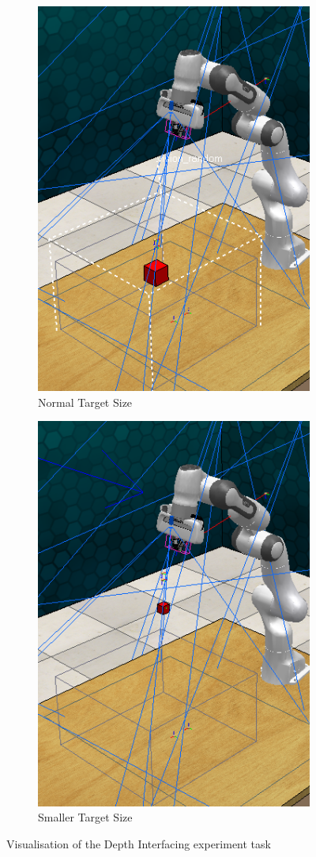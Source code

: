 \begin{figure}[htpb] %
  \centering
  \begin{subfigure}{0.4\linewidth}
    \centering
    \includegraphics[width=0.7\linewidth]{assets/depth-interfacing/normal-size-grasp.png}
    \caption{Normal Target Size}\label{subfig:normal-grasp}
  \end{subfigure}
  \begin{subfigure}{0.4\linewidth}
    \centering
    \includegraphics[width=0.7\linewidth]{assets/depth-interfacing/smaller-grasp.png}
    \caption{Smaller Target Size}\label{subfig:small-grasp}
  \end{subfigure}
  \caption{Visualisation of the Depth Interfacing experiment task}\label{fig:di-task}
\end{figure}

